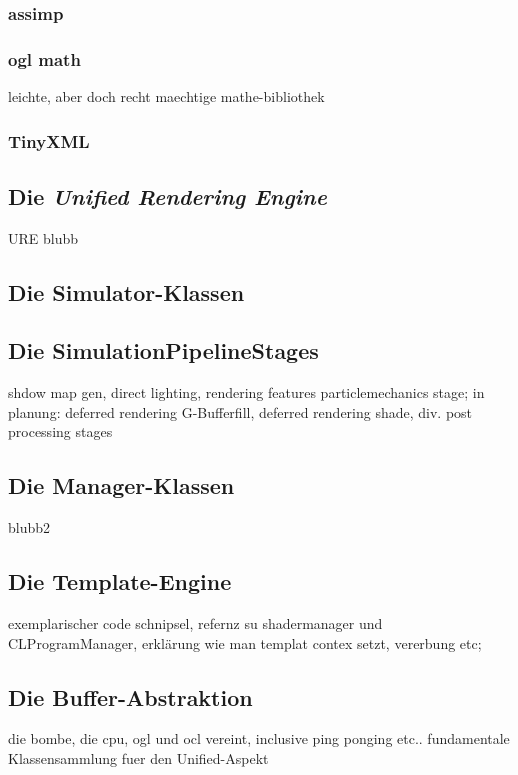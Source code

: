     \subsubsection{assimp}
    \subsubsection{ogl math}
    	leichte, aber doch recht maechtige mathe-bibliothek
    \subsubsection{TinyXML}
    	
    	
\subsection{Die \emph{Unified Rendering Engine}}
URE blubb

\subsection{Die Simulator-Klassen}

\subsection{Die SimulationPipelineStages}
	shdow map gen, direct lighting, rendering features particlemechanics stage;
	in planung: deferred rendering G-Bufferfill, deferred rendering shade, div. post processing stages

\subsection{Die Manager-Klassen}
blubb2

\subsection{Die Template-Engine}
	\label{sec:architecture:templateEngine}
	exemplarischer code schnipsel, refernz su shadermanager und CLProgramManager, erklärung wie man templat contex setzt, 	
	vererbung etc;
    	
\subsection{Die Buffer-Abstraktion}  
	\label{sec:architecture:BufferAbstraction} 	
 	die bombe, die cpu, ogl und ocl vereint, inclusive ping ponging etc.. 
 	fundamentale Klassensammlung fuer den Unified-Aspekt
 	
